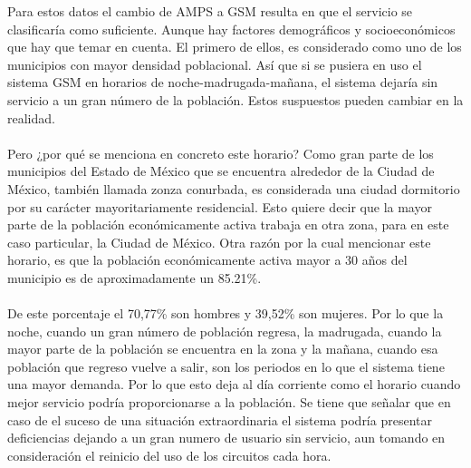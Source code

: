 \documentclass[11pt,letterpaper]{article}
\begin{document}
Para estos datos el cambio de AMPS a GSM resulta en que el servicio se clasificaría como 
suficiente. Aunque hay factores demográficos y socioeconómicos que hay que temar en 
cuenta. El primero de ellos, es considerado como uno de los municipios con mayor densidad 
poblacional. Así que si se pusiera en uso el sistema GSM en horarios de noche-madrugada-mañana, 
el sistema dejaría sin servicio a un gran número de la población. Estos suspuestos pueden cambiar 
en la realidad. 
\\ \\
Pero ¿por qué se menciona 
en concreto este horario? Como gran parte de los municipios del Estado de México que se 
encuentra alrededor de la Ciudad de México, también llamada zonza conurbada, es considerada 
una ciudad dormitorio por su carácter mayoritariamente residencial. Esto quiere decir que 
la mayor parte de la población económicamente activa trabaja en otra zona, para en este caso 
particular, la Ciudad de México. Otra razón por la cual mencionar este horario, es que la 
población económicamente activa mayor a 30 años del municipio es de aproximadamente un 85.21\%. 
\\ \\
De este porcentaje el 70,77\% son hombres y 39,52\% son mujeres. Por lo que la noche, cuando 
un gran número de población regresa, la madrugada, cuando la mayor parte de la población se 
encuentra en la zona y la mañana, cuando esa población que regreso vuelve a salir, son los 
periodos en lo que el sistema tiene una mayor demanda. Por lo que esto deja al día corriente 
como el horario cuando mejor servicio podría proporcionarse a la población. Se tiene que 
señalar que en caso de el suceso de una situación extraordinaria el sistema podría presentar 
deficiencias dejando a un gran numero de usuario sin servicio, aun tomando en consideración 
el reinicio del uso de los circuitos cada hora.
\end{document}
